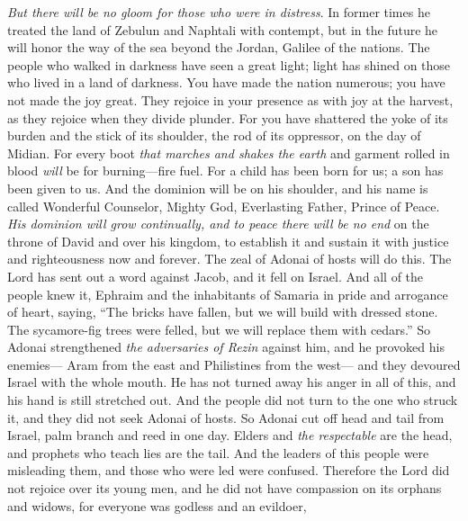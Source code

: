 \begin{biblechapter} %
  \textit{But there will be no gloom for those who were in distress}. In former times he treated the land of Zebulun and Naphtali with contempt, but in the future he will honor the way of the sea beyond the Jordan, Galilee of the nations.
\verse The people who walked in darkness have seen a great light; 
light has shined on those who lived in a land of darkness.
\verse You have made the nation numerous; 
you have not made the joy great. 
They rejoice in your presence as with joy at the harvest, 
as they rejoice when they divide plunder.
\verse For you have shattered the yoke of its burden 
and the stick of its shoulder, 
the rod of its oppressor, on the day of Midian.
\verse For every boot \textit{that marches and shakes the earth} 
and garment rolled in blood 
\textit{will} be for burning—fire fuel.
\verse For a child has been born for us; 
a son has been given to us. 
And the dominion will be on his shoulder, 
and his name is called Wonderful Counselor, Mighty God, 
Everlasting Father, Prince of Peace.
\verse \textit{His dominion will grow continually, 
and to peace there will be no end} 
on the throne of David and over his kingdom, 
to establish it and sustain it 
with justice and righteousness 
now and forever. 
The zeal of Adonai of hosts will do this.
 The Lord has sent out a word against Jacob, 
and it fell on Israel.
\verse And all of the people knew it, 
Ephraim and the inhabitants of Samaria 
in pride and arrogance of heart, saying,
\verse “The bricks have fallen, but we will build with dressed stone. 
The sycamore-fig trees were felled, but we will replace them with cedars.”
\verse So Adonai strengthened \textit{the adversaries of Rezin} against him, 
and he provoked his enemies—
\verse Aram from the east 
and Philistines from the west— 
and they devoured Israel with the whole mouth. 
He has not turned away his anger in all of this, 
and his hand is still stretched out.
\verse And the people did not turn to the one who struck it, 
and they did not seek Adonai of hosts.
\verse So Adonai cut off head and tail from Israel, 
palm branch and reed in one day.
\verse Elders and \textit{the respectable} are the head, 
and prophets who teach lies are the tail.
\verse And the leaders of this people were misleading them, 
and those who were led were confused.
\verse Therefore the Lord did not rejoice over its young men, 
and he did not have compassion on its orphans and widows, 
for everyone was godless and an evildoer, 

\end{biblechapter}

